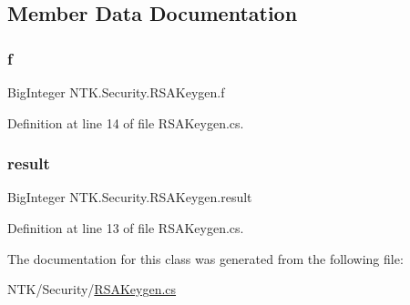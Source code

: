 \subsection{Member Data Documentation}
\mbox{\label{class_n_t_k_1_1_security_1_1_r_s_a_keygen_a38d253e3c2f4c9680392e7627a0b166b}} 
\subsubsection{\texorpdfstring{f}{f}}
{\footnotesize\ttfamily Big\+Integer N\+T\+K.\+Security.\+R\+S\+A\+Keygen.\+f}



Definition at line 14 of file R\+S\+A\+Keygen.\+cs.

\mbox{\label{class_n_t_k_1_1_security_1_1_r_s_a_keygen_ac50802718c92927190923a5ba75263ff}} 
\subsubsection{\texorpdfstring{result}{result}}
{\footnotesize\ttfamily Big\+Integer N\+T\+K.\+Security.\+R\+S\+A\+Keygen.\+result}



Definition at line 13 of file R\+S\+A\+Keygen.\+cs.



The documentation for this class was generated from the following file\+:\begin{DoxyCompactItemize}
\item 
N\+T\+K/\+Security/\mbox{\hyperlink{_r_s_a_keygen_8cs}{R\+S\+A\+Keygen.\+cs}}\end{DoxyCompactItemize}
